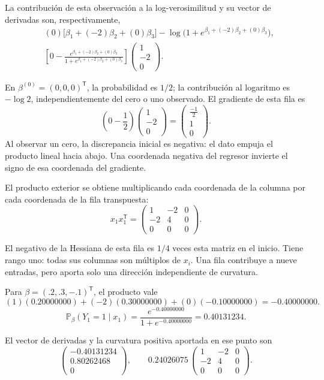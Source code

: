 \documentclass[11pt,a4paper]{article}
\newcommand{\Prob}{\mathbb P}
\newcommand{\T}{^{\mathsf T}}
\begin{document}
La contribución de esta observación a la log-verosimilitud
y su vector de derivadas son, respectivamente,
\[
\begin{aligned}
&(0)\bigl[\beta_1+(-2)\beta_2+(0)\beta_3\bigr]-\log\bigl(1+e^{\beta_1+(-2)\beta_2+(0)\beta_3}\bigr),\\&\left[0-\frac{e^{\beta_1+(-2)\beta_2+(0)\beta_3}}{1+e^{\beta_1+(-2)\beta_2+(0)\beta_3}}\right]\begin{pmatrix}1\\-2\\0\end{pmatrix}.\end{aligned}
\]

En \(\beta^{(0)}=(0,0,0)\T\), la probabilidad es \(1/2\);
la contribución al logaritmo es \(-\log2\), independientemente
del cero o uno observado. El gradiente de esta fila es
\[
\left(0-\frac12\right)\begin{pmatrix}1\\-2\\0\end{pmatrix}=\begin{pmatrix}\frac{-1}{2}\\1\\0\end{pmatrix}.
\]
Al observar un cero, la discrepancia inicial es negativa: el dato empuja el producto lineal hacia abajo. Una coordenada negativa del regresor invierte el signo de esa coordenada del gradiente.

El producto exterior se obtiene multiplicando cada coordenada
de la columna por cada coordenada de la fila transpuesta:
\[
x_{1}x_{1}\T=\begin{pmatrix}1&-2&0\\-2&4&0\\0&0&0\end{pmatrix}.
\]

El negativo de la Hessiana de esta fila es \(1/4\)
veces esta matriz en el inicio. Tiene rango uno:
todas sus columnas son múltiplos de \(x_i\).
Una fila contribuye a nueve entradas, pero aporta
solo una dirección independiente de curvatura.

Para \(\beta=(.2,.3,-.1)\T\), el producto vale
\[
(1)(0.20000000)+(-2)(0.30000000)+(0)(-0.10000000)=-0.40000000.
\]
\[
\Prob_\beta(Y_{1}=1\mid x_{1})=\frac{e^{-0.40000000}}{1+e^{-0.40000000}}=0.40131234.
\]

El vector de derivadas y la curvatura positiva aportada
en ese punto son
\[
\begin{pmatrix}-0.40131234\\0.80262468\\0\end{pmatrix},\qquad 0.24026075\,\begin{pmatrix}1&-2&0\\-2&4&0\\0&0&0\end{pmatrix}.
\]
\end{document}
